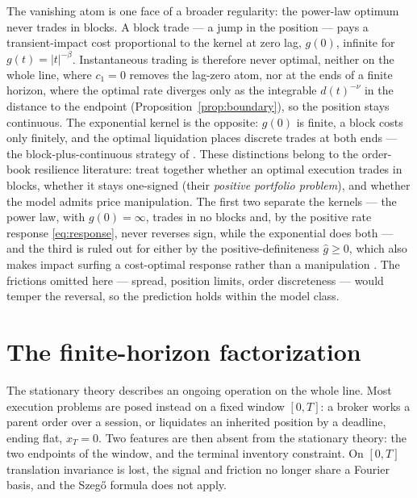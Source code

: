 \documentclass[11pt]{article}
\theoremstyle{plain}
\theoremstyle{definition}
\theoremstyle{remark}
\begin{document}
The vanishing atom is one face of a broader regularity: the power-law optimum never trades in blocks. A block trade --- a jump in the position --- pays a transient-impact cost proportional to the kernel at zero lag, $g(0)$, infinite for $g(t)=|t|^{-\beta}$. Instantaneous trading is therefore never optimal, neither on the whole line, where $c_1=0$ removes the lag-zero atom, nor at the ends of a finite horizon, where the optimal rate diverges only as the integrable $d(t)^{-\nu}$ in the distance to the endpoint (Proposition~\ref{prop:boundary}), so the position stays continuous. The exponential kernel is the opposite: $g(0)$ is finite, a block costs only finitely, and the optimal liquidation places discrete trades at both ends --- the block-plus-continuous strategy of \citet{ObizhaevaWang2013}. These distinctions belong to the order-book resilience literature: \citet{AlfonsiSchiedSlynko2012} treat together whether an optimal execution trades in blocks, whether it stays one-signed (their \emph{positive portfolio problem}), and whether the model admits price manipulation. The first two separate the kernels --- the power law, with $g(0)=\infty$, trades in no blocks and, by the positive rate response \eqref{eq:response}, never reverses sign, while the exponential does both --- and the third is ruled out for either by the positive-definiteness $\hat g\ge0$, which also makes impact surfing a cost-optimal response rather than a manipulation \citep{Gatheral2010,AlfonsiSchiedSlynko2012}. The frictions omitted here --- spread, position limits, order discreteness --- would temper the reversal, so the prediction holds within the model class.

\section{The finite-horizon factorization}\label{sec:boundary}

The stationary theory describes an ongoing operation on the whole line. Most execution problems are posed instead on a fixed window $[0,T]$: a broker works a parent order over a session, or liquidates an inherited position by a deadline, ending flat, $x_T=0$. Two features are then absent from the stationary theory: the two endpoints of the window, and the terminal inventory constraint. On $[0,T]$ translation invariance is lost, the signal and friction no longer share a Fourier basis, and the Szeg\H{o} formula does not apply.
\end{document}
